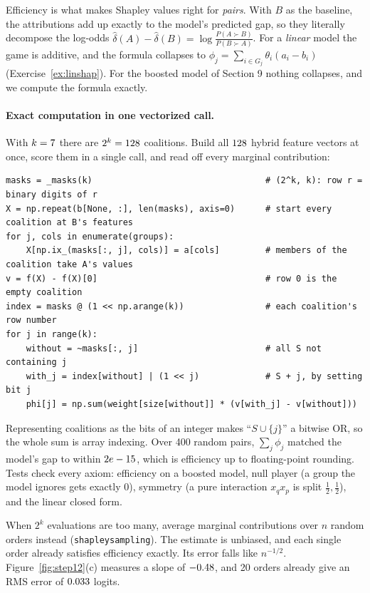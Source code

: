 \documentclass[11pt]{article}
\theoremstyle{definition}
\theoremstyle{plain}
\theoremstyle{remark}
\newcommand{\code}[1]{\texttt{#1}}
\renewcommand{\_}{\oldunderscore\allowbreak}
\newcommand{\file}[1]{\textcolor{blue!50!black}{\texttt{#1}}}
\newcommand{\codefrom}[1]{\par\smallskip\noindent{\footnotesize\textbf{From} \file{#1}}}
\begin{document}
Efficiency is what makes Shapley values right for \emph{pairs}. With $B$ as the baseline, the attributions add up exactly to the model's predicted gap, so they literally decompose
the log-odds $\hat\delta(A)-\hat\delta(B)=\log\frac{P(A\succ B)}{P(B\succ A)}$. For a \emph{linear} model the game is additive, and the formula collapses to
$\phi_j=\sum_{i\in G_j}\theta_i(a_i-b_i)$ (Exercise~\ref{ex:linshap}). For the boosted model of Section 9 nothing collapses, and we compute the formula exactly.

\paragraph{Exact computation in one vectorized call.}
With $k=7$ there are $2^k=128$ coalitions. Build all $128$ hybrid feature vectors at once, score them in a single call, and read off every marginal contribution:

\codefrom{src/calcdiff/explain.py}
\begin{lstlisting}
masks = _masks(k)                                  # (2^k, k): row r = binary digits of r
X = np.repeat(b[None, :], len(masks), axis=0)      # start every coalition at B's features
for j, cols in enumerate(groups):
    X[np.ix_(masks[:, j], cols)] = a[cols]         # members of the coalition take A's values
v = f(X) - f(X)[0]                                 # row 0 is the empty coalition
index = masks @ (1 << np.arange(k))                # each coalition's row number
for j in range(k):
    without = ~masks[:, j]                         # all S not containing j
    with_j = index[without] | (1 << j)             # S + j, by setting bit j
    phi[j] = np.sum(weight[size[without]] * (v[with_j] - v[without]))
\end{lstlisting}
Representing coalitions as the bits of an integer makes ``$S\cup\{j\}$'' a bitwise OR, so the whole sum is array indexing. Over 400 random pairs, $\sum_j\phi_j$ matched the model's gap
to within $2e-15$, which is efficiency up to floating-point rounding. Tests check every axiom: efficiency on a boosted model, null player (a group the model ignores gets exactly 0),
symmetry (a pure interaction $x_qx_p$ is split $\frac12,\frac12$), and the linear closed form.

When $2^k$ evaluations are too many, average marginal contributions over $n$ random orders instead (\code{shapley\_sampling}). The estimate is unbiased, and each
single order already satisfies efficiency exactly. Its error falls like $n^{-1/2}$. Figure~\ref{fig:step12}(c) measures a slope of $-0.48$, and 20 orders already give an RMS error of $0.033$ logits.
\end{document}
